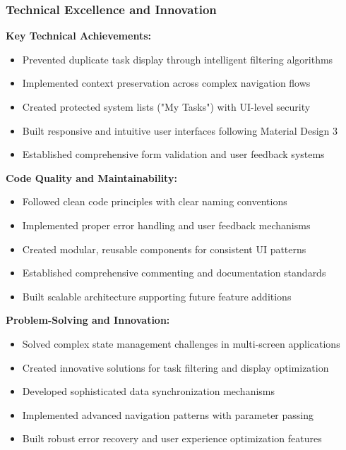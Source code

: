 \subsubsection{Technical Excellence and Innovation}

\textbf{Key Technical Achievements:}
\begin{itemize}
    \item Prevented duplicate task display through intelligent filtering algorithms
    \item Implemented context preservation across complex navigation flows
    \item Created protected system lists ("My Tasks") with UI-level security
    \item Built responsive and intuitive user interfaces following Material Design 3
    \item Established comprehensive form validation and user feedback systems
\end{itemize}

\textbf{Code Quality and Maintainability:}
\begin{itemize}
    \item Followed clean code principles with clear naming conventions
    \item Implemented proper error handling and user feedback mechanisms
    \item Created modular, reusable components for consistent UI patterns
    \item Established comprehensive commenting and documentation standards
    \item Built scalable architecture supporting future feature additions
\end{itemize}

\textbf{Problem-Solving and Innovation:}
\begin{itemize}
    \item Solved complex state management challenges in multi-screen applications
    \item Created innovative solutions for task filtering and display optimization
    \item Developed sophisticated data synchronization mechanisms
    \item Implemented advanced navigation patterns with parameter passing
    \item Built robust error recovery and user experience optimization features
\end{itemize}